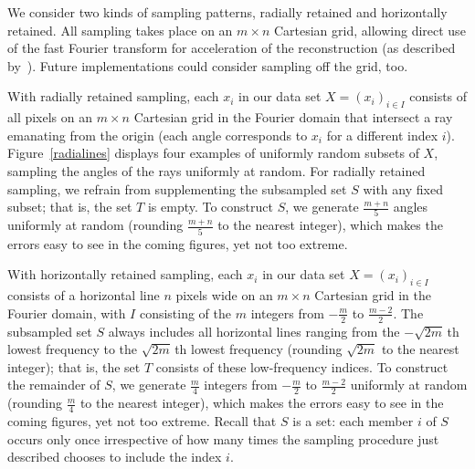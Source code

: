 \documentclass[article]{jdssv}
\begin{document}
We consider two kinds of sampling patterns,
radially retained and horizontally retained.
All sampling takes place on an $m \times n$ Cartesian grid,
allowing direct use of the fast Fourier transform
for acceleration of the reconstruction (as described by~\citet{tao-yang}).
Future implementations could consider sampling off the grid, too.

With radially retained sampling,
each $x_i$ in our data set $X = (x_i)_{i \in I}$
consists of all pixels on an $m \times n$ Cartesian grid in the Fourier domain
that intersect a ray emanating from the origin (each angle corresponds
to $x_i$ for a different index $i$). Figure~\ref{radialines} displays
four examples of uniformly random subsets of $X$, sampling the angles
of the rays uniformly at random.
For radially retained sampling, we refrain from supplementing
the subsampled set $S$ with any fixed subset; that is, the set $T$ is empty.
To construct $S$, we generate $\frac{m + n}{5}$ angles uniformly at random
(rounding $\frac{m + n}{5}$ to the nearest integer), which makes the errors
easy to see in the coming figures, yet not too extreme.

With horizontally retained sampling,
each $x_i$ in our data set $X = (x_i)_{i \in I}$
consists of a horizontal line $n$ pixels wide on an $m \times n$ Cartesian grid
in the Fourier domain, with $I$ consisting of the $m$ integers
from $-\frac{m}{2}$ to $\frac{m-2}{2}$.
The subsampled set $S$ always includes
all horizontal lines ranging from the $-\sqrt{2m}\,$th lowest frequency
to the $\sqrt{2m}\,$th lowest frequency
(rounding $\sqrt{2m}$ to the nearest integer);
that is, the set $T$ consists of these low-frequency indices.
To construct the remainder of $S$, we generate $\frac{m}{4}$ integers
from $-\frac{m}{2}$ to $\frac{m-2}{2}$ uniformly at random
(rounding $\frac{m}{4}$ to the nearest integer), which makes the errors
easy to see in the coming figures, yet not too extreme.
Recall that $S$ is a set: each member $i$ of $S$
occurs only once irrespective of how many times the sampling procedure
just described chooses to include the index $i$.
\end{document}
